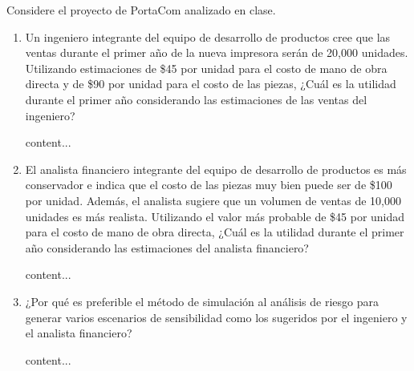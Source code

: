 \begin{problema}
	Considere el proyecto de PortaCom analizado en clase.  
	
	\begin{enumerate}
		\item Un ingeniero integrante del equipo de desarrollo de productos cree que las ventas durante el primer año de la nueva impresora serán de 20,000 unidades. Utilizando estimaciones de \$45 por unidad para el costo de mano de obra directa y de \$90 por unidad para el costo de las piezas, ¿Cuál es la utilidad durante el primer año considerando las estimaciones de las ventas del ingeniero? 
		\begin{sol}
			content...
		\end{sol}
		\item El analista financiero integrante del equipo de desarrollo de productos es más conservador e indica que el costo de las piezas muy bien puede ser de \$100 por unidad. Además, el analista sugiere que un volumen de ventas de 10,000 unidades es más realista. Utilizando el valor más probable de \$45 por unidad para el costo de mano de obra directa, ¿Cuál es la utilidad durante el primer año considerando las estimaciones del analista financiero? 
				\begin{sol}
			content...
		\end{sol}
		\item  ¿Por qué es preferible el método de simulación al análisis de riesgo para generar varios escenarios de sensibilidad como los sugeridos por el ingeniero y el analista financiero? 
				\begin{sol}
			content...
		\end{sol}
	\end{enumerate}
\end{problema}

%
%

